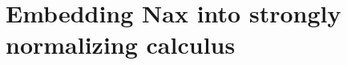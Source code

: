 \documentclass{llncs}
\newcommand{\ie}{{i.e.}}
\begin{document}

% 
% 







\section{Embedding Nax into strongly normalizing calculus}\label{sec:theory}
\end{document}
